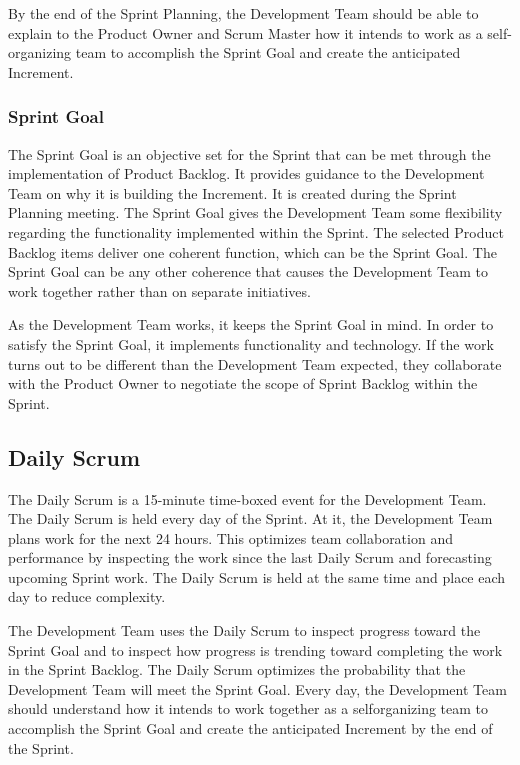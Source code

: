 By the end of the Sprint Planning, the Development Team should be able to explain to the
Product Owner and Scrum Master how it intends to work as a self-organizing team to
accomplish the Sprint Goal and create the anticipated Increment.

\subsubsection{Sprint Goal}
The Sprint Goal is an objective set for the Sprint that can be met through the implementation of
Product Backlog. It provides guidance to the Development Team on why it is building the
Increment. It is created during the Sprint Planning meeting. The Sprint Goal gives the
Development Team some flexibility regarding the functionality implemented within the Sprint.
The selected Product Backlog items deliver one coherent function, which can be the Sprint Goal.
The Sprint Goal can be any other coherence that causes the Development Team to work
together rather than on separate initiatives.

As the Development Team works, it keeps the Sprint Goal in mind. In order to satisfy the Sprint
Goal, it implements functionality and technology. If the work turns out to be different than the
Development Team expected, they collaborate with the Product Owner to negotiate the scope
of Sprint Backlog within the Sprint. 

\subsection{Daily Scrum}
The Daily Scrum is a 15-minute time-boxed event for the Development Team. The Daily Scrum is
held every day of the Sprint. At it, the Development Team plans work for the next 24 hours. This
optimizes team collaboration and performance by inspecting the work since the last Daily Scrum
and forecasting upcoming Sprint work. The Daily Scrum is held at the same time and place each
day to reduce complexity.

The Development Team uses the Daily Scrum to inspect progress toward the Sprint Goal and to
inspect how progress is trending toward completing the work in the Sprint Backlog. The Daily
Scrum optimizes the probability that the Development Team will meet the Sprint Goal. Every
day, the Development Team should understand how it intends to work together as a selforganizing
team to accomplish the Sprint Goal and create the anticipated Increment by the end
of the Sprint.

